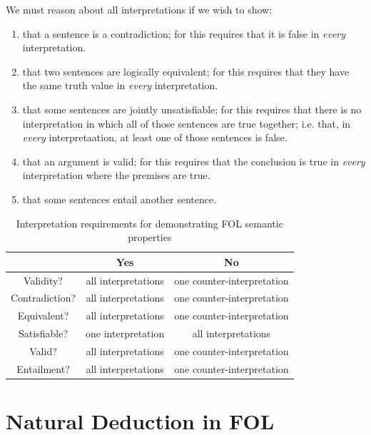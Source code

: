 \documentclass[12pt, a4paper, oneside, openright, titlepage]{book}
\begin{document}
\begin{rmk}
    We must reason about all interpretations if we wish to show: \begin{enumerate}
        \item that a sentence is a contradiction; for this requires that it is false in \emph{every} interpretation.
        \item that two sentences are logically equivalent; for this requires that they have the same truth value in \emph{every} interpretation. 
        \item that some sentences are jointly unsatisfiable; for this requires that there is no interpretation in which all of those sentences are true together; i.e. that, in \emph{every} interpretaation, at least one of those sentences is false.
        \item that an argument is valid; for this requires that the conclusion is true in \emph{every} interpretation where the premises are true.
        \item that some sentences entail another sentence.
    \end{enumerate}
\end{rmk}


\begin{table}[H]
    \centering
    \caption{Interpretation requirements for demonstrating FOL semantic properties}
    \begin{tabular}{c|cc}
        & \textbf{Yes} & \textbf{No} \\ \hline
        Validity? & all interpretations & one counter-interpretation \\
        Contradiction? & all interpretations & one counter-interpretation \\
        Equivalent? & all interpretations & one counter-interpretation \\
        Satisfiable? & one interpretation & all interpretations \\
        Valid? & all interpretations & one counter-interpretation \\
        Entailment? & all interpretations & one counter-interpretation \\
    \end{tabular}
\end{table}



\chapter{\textsection\textsection Natural Deduction in FOL}
\end{document}
